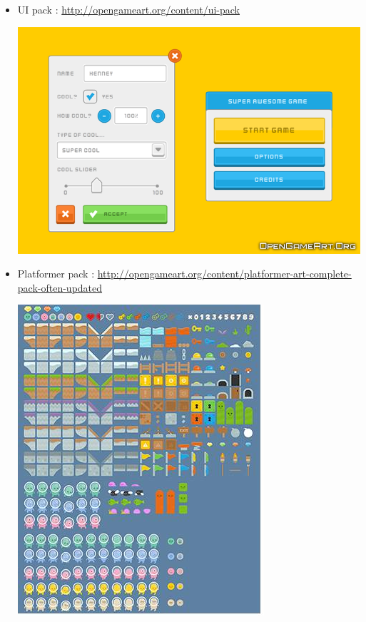 \documentclass[11pt]{report}
\begin{document}
        		\begin{itemize}
	        		\item UI pack : \url{http://opengameart.org/content/ui-pack}
		      		\begin{center}
					  	\includegraphics[scale=0.4]{sample_19.png}
		      		\end{center}
					\item Platformer pack : \url{http://opengameart.org/content/platformer-art-complete-pack-often-updated}
		      		\begin{center}
					  	\includegraphics[scale=0.5]{tileset.jpg}
		      		\end{center}
				\end{itemize}
				
\end{document}
